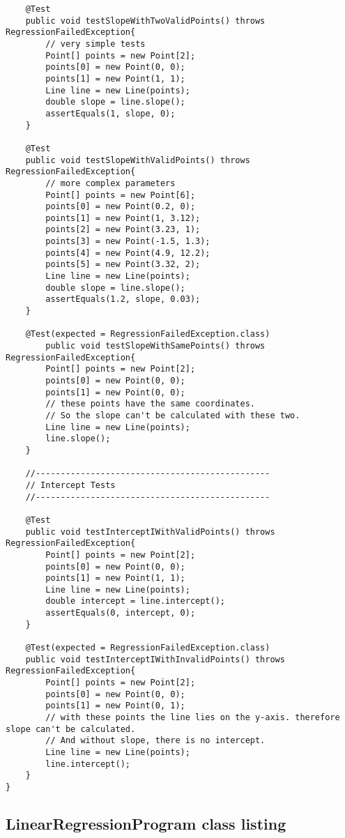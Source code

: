 \begin{lstlisting}
	@Test
	public void testSlopeWithTwoValidPoints() throws RegressionFailedException{
		// very simple tests
		Point[] points = new Point[2];
		points[0] = new Point(0, 0);
		points[1] = new Point(1, 1);
		Line line = new Line(points);
		double slope = line.slope();
		assertEquals(1, slope, 0);
	}
	
	@Test
	public void testSlopeWithValidPoints() throws RegressionFailedException{
		// more complex parameters
		Point[] points = new Point[6];
		points[0] = new Point(0.2, 0);
		points[1] = new Point(1, 3.12);
		points[2] = new Point(3.23, 1);
		points[3] = new Point(-1.5, 1.3);
		points[4] = new Point(4.9, 12.2);
		points[5] = new Point(3.32, 2);
		Line line = new Line(points);
		double slope = line.slope();
		assertEquals(1.2, slope, 0.03);
	}
	
	@Test(expected = RegressionFailedException.class)
		public void testSlopeWithSamePoints() throws RegressionFailedException{
		Point[] points = new Point[2];
		points[0] = new Point(0, 0);
		points[1] = new Point(0, 0);
		// these points have the same coordinates. 
		// So the slope can't be calculated with these two.
		Line line = new Line(points);
		line.slope();
	}
	
	//-----------------------------------------------
	// Intercept Tests
	//-----------------------------------------------
	
	@Test
	public void testInterceptIWithValidPoints() throws RegressionFailedException{
		Point[] points = new Point[2];
		points[0] = new Point(0, 0);
		points[1] = new Point(1, 1);
		Line line = new Line(points);
		double intercept = line.intercept();
		assertEquals(0, intercept, 0);
	}
	
	@Test(expected = RegressionFailedException.class)
	public void testInterceptIWithInvalidPoints() throws RegressionFailedException{
		Point[] points = new Point[2];
		points[0] = new Point(0, 0);
		points[1] = new Point(0, 1);
		// with these points the line lies on the y-axis. therefore slope can't be calculated. 
		// And without slope, there is no intercept.
		Line line = new Line(points);
		line.intercept();
	}
}
\end{lstlisting}

\pagebreak
\subsection{LinearRegressionProgram class listing}
\label{subsec: analyser-class-listing}


